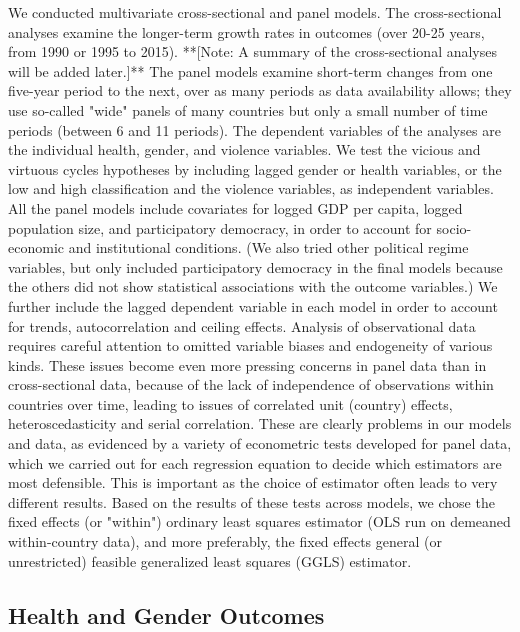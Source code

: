\documentclass[12pt]{article}
\begin{document}
We conducted multivariate cross-sectional and panel models. The cross-sectional analyses examine the longer-term growth rates in outcomes (over 20-25 years, from 1990 or 1995 to 2015). **[Note: A summary of the cross-sectional analyses will be added later.]**
The panel models examine short-term changes from one five-year period to the next, over as many periods as data availability allows; they use so-called "wide" panels of many countries but only a small number of time periods (between 6 and 11 periods). The dependent variables of the analyses are the individual health, gender, and violence variables. We test the vicious and virtuous cycles hypotheses by including lagged gender or health variables, or the low and high classification and the violence variables, as independent variables. All the panel models include covariates for logged GDP per capita, logged population size, and participatory democracy, in order to account for socio-economic and institutional conditions. (We also tried other political regime variables, but only included participatory democracy in the final models because the others did not show statistical associations with the outcome variables.) We further include the lagged dependent variable in each model in order to account for trends, autocorrelation and ceiling effects.
Analysis of observational data requires careful attention to omitted variable biases and endogeneity of various kinds. These issues become even more pressing concerns in panel data than in cross-sectional data, because of the lack of independence of observations within countries over time, leading to issues of correlated unit (country) effects, heteroscedasticity and serial correlation. These are clearly problems in our models and data, as evidenced by a variety of econometric tests developed for panel data, which we carried out for each regression equation to decide which estimators are most defensible. This is important as the choice of estimator often leads to very different results. Based on the results of these tests across models, we chose the fixed effects (or "within") ordinary least squares estimator (OLS run on demeaned within-country data), and more preferably, the fixed effects general (or unrestricted) feasible generalized least squares (GGLS) estimator.

\subsection{Health and Gender Outcomes}

\end{document}
